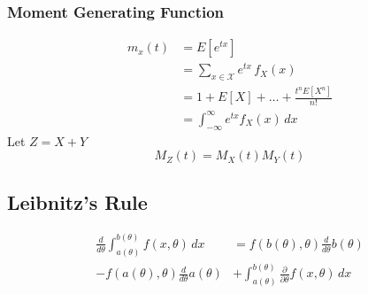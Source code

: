 	\subsubsection*{Moment Generating Function}
		\begin{equation*}
			\begin{split}
				m_x(t) &= E[e^{tx}] \\
				&= \sum_{x\in\mathcal X} e^{tx}\,f_X(x) \\
				&= 1 + E[X] + \ldots + \frac{t^nE[X^n]}{n!} \\
				&= \int_{-\infty}^{\infty} e^{tx} f_X(x) \,dx
			\end{split}
		\end{equation*}
		Let \(Z=X+Y\)
		\[M_Z(t) = M_X(t)M_Y(t)\]

\subsection*{Leibnitz's Rule}
	\begin{equation*}
		\begin{split}
			\frac{d}{d\theta} 
			\int^{b(\theta)}_{a(\theta)} f(x, \theta) \,dx
			&= f(b(\theta), \theta) \frac{d}{d\theta} b(\theta) \\
			- f(a(\theta), \theta) \frac{d}{d\theta} a(\theta)
			&+  \int^{b(\theta)}_{a(\theta)}\frac{\partial}{\partial\theta} f(x, \theta) \,dx
		\end{split}
	\end{equation*}


